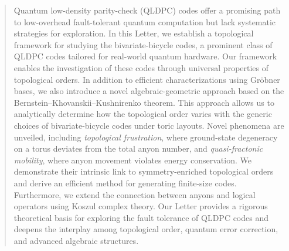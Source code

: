 \documentclass[aps,prl,english,superscriptaddress,twocolumn,tightenlines,showpacs,longbibliography,floatfix,amsfonts]{revtex4-2}
\begin{document}
	\begin{abstract}
		Quantum low-density parity-check (QLDPC) codes offer a promising path to low-overhead fault-tolerant quantum computation but lack systematic strategies for exploration.
		In this Letter, we establish a topological framework for studying the bivariate-bicycle codes, a prominent class of QLDPC codes tailored for real-world quantum hardware.
		Our framework enables the investigation of these codes through universal properties of topological orders.
		In addition to efficient characterizations using Gr\"obner bases, we also introduce a novel algebraic-geometric approach based on the Bernstein--Khovanskii--Kushnirenko theorem.
		This approach allows us to analytically determine how the topological order varies with the generic choices of bivariate-bicycle codes under toric layouts. 
		Novel phenomena are unveiled, including \emph{topological frustration}, where ground-state degeneracy on a torus deviates from the total anyon number, and \emph{quasi-fractonic mobility}, where anyon movement violates energy conservation.
		We demonstrate their intrinsic link to symmetry-enriched topological orders and derive an efficient method for generating finite-size codes. 
		Furthermore, we extend the connection between anyons and logical operators using Koszul complex theory. 
		Our Letter provides a rigorous theoretical basis for exploring the fault tolerance of QLDPC codes and deepens the interplay among topological order, quantum error correction, and advanced algebraic structures.
	\end{abstract}
	
	\maketitle
	
\end{document}
